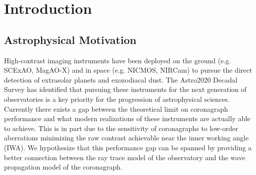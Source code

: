 \section{Introduction}
\label{sect:intro}  %
\subsection{Astrophysical Motivation}

High-contrast imaging instruments have been deployed on the ground (e.g. SCExAO\cite{Lozi18}, MagAO-X\cite{Males18}) and in space (e.g. NICMOS\cite{thompson_nicmos_1994}, NIRCam\cite{horner_nircam_2004}) to pursue the direct detection of extrasolar planets and exozodiacal dust. 
The Astro2020 Decadal Survey has identified that pursuing these instruments for the next generation of observatories is a key priority for the progression of astrophysical sciences\cite{Astro2020}. 
Currently there exists a gap between the theoretical limit on coronagraph performance and what modern realizations of these instruments are actually able to achieve. 
This is in part due to the sensitivity of coronagraphs to low-order aberrations minimizing the raw contrast achievable near the inner working angle (IWA)\cite{shaklan19}. 
We hypothesize that this performance gap can be spanned by providing a better connection between the ray trace model of the observatory and the wave propagation model of the coronagraph. 

